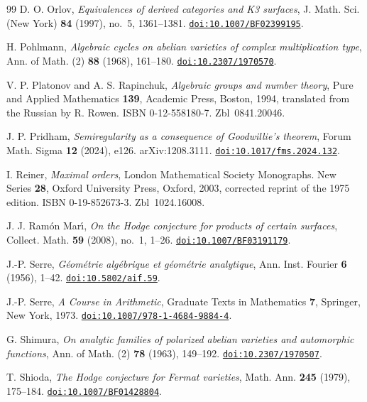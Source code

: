 \documentclass[11pt,reqno]{amsart}
\numberwithin{equation}{section}
\theoremstyle{plain}
\theoremstyle{definition}
\begin{document}
\begin{thebibliography}{99}
D. O. Orlov,
\emph{Equivalences of derived categories and K3 surfaces},
J. Math. Sci. (New York) \textbf{84} (1997), no.~5, 1361--1381.
\href{https://doi.org/10.1007/BF02399195}{\nolinkurl{doi:10.1007/BF02399195}}.

H. Pohlmann,
\emph{Algebraic cycles on abelian varieties of complex multiplication type},
Ann. of Math. (2) \textbf{88} (1968), 161--180.
\href{https://doi.org/10.2307/1970570}{\nolinkurl{doi:10.2307/1970570}}.

V. P. Platonov and A. S. Rapinchuk,
\emph{Algebraic groups and number theory},
Pure and Applied Mathematics \textbf{139}, Academic Press, Boston, 1994, translated from the Russian by R. Rowen. ISBN 0-12-558180-7. Zbl~0841.20046.

J. P. Pridham,
\emph{Semiregularity as a consequence of Goodwillie's theorem},
Forum Math. Sigma \textbf{12} (2024), e126. arXiv:1208.3111.
\href{https://doi.org/10.1017/fms.2024.132}{\nolinkurl{doi:10.1017/fms.2024.132}}.

I. Reiner,
\emph{Maximal orders},
London Mathematical Society Monographs. New Series \textbf{28}, Oxford University Press, Oxford, 2003, corrected reprint of the 1975 edition. ISBN 0-19-852673-3. Zbl~1024.16008.

J. J. Ram\'on Mar\'{\i},
\emph{On the Hodge conjecture for products of certain surfaces},
Collect. Math. \textbf{59} (2008), no.~1, 1--26.
\href{https://doi.org/10.1007/BF03191179}{\nolinkurl{doi:10.1007/BF03191179}}.

J.-P. Serre,
\emph{G\'eom\'etrie alg\'ebrique et g\'eom\'etrie analytique},
Ann. Inst. Fourier \textbf{6} (1956), 1--42.
\href{https://doi.org/10.5802/aif.59}{\nolinkurl{doi:10.5802/aif.59}}.

J.-P. Serre,
\emph{A Course in Arithmetic},
Graduate Texts in Mathematics \textbf{7}, Springer, New York, 1973.
\href{https://doi.org/10.1007/978-1-4684-9884-4}{\nolinkurl{doi:10.1007/978-1-4684-9884-4}}.

G. Shimura,
\emph{On analytic families of polarized abelian varieties and automorphic functions},
Ann. of Math. (2) \textbf{78} (1963), 149--192.
\href{https://doi.org/10.2307/1970507}{\nolinkurl{doi:10.2307/1970507}}.

T. Shioda,
\emph{The Hodge conjecture for Fermat varieties},
Math. Ann. \textbf{245} (1979), 175--184.
\href{https://doi.org/10.1007/BF01428804}{\nolinkurl{doi:10.1007/BF01428804}}.


\end{thebibliography}
\end{document}
